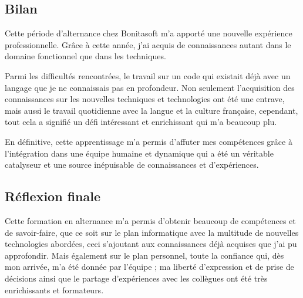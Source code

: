 \subsection{Bilan}
Cette période d'alternance chez Bonitasoft m'a apporté une nouvelle expérience professionnelle. Grâce à cette année, j'ai acquis de connaissances autant dans le domaine fonctionnel que dans les techniques.

Parmi les difficultés rencontrées, le travail sur un code qui existait déjà avec un langage que je ne connaissais pas en profondeur. Non seulement l'acquisition des connaissances sur les nouvelles techniques et technologies ont été une entrave, mais aussi le travail quotidienne avec la langue et la culture française, cependant, tout cela a signifié un défi intéressant et enrichissant qui m'a beaucoup plu.

En définitive, cette apprentissage m'a permis d'affuter mes compétences grâce à l'intégration dans une équipe humaine et dynamique qui a été un véritable catalyseur et une source inépuisable de connaissances et d'expériences.


\subsection{Réflexion finale}
Cette formation en alternance m'a permis d'obtenir beaucoup de compétences et de savoir-faire, que ce soit sur le plan informatique avec la multitude de nouvelles technologies abordées, ceci s'ajoutant aux connaissances déjà acquises que j'ai pu approfondir. Mais également sur le plan personnel, toute la confiance qui, dès mon arrivée, m'a été donnée par l'équipe ; ma liberté d'expression et de prise de décisions ainsi que le partage d'expériences avec les collègues ont été très enrichissants et formateurs.
